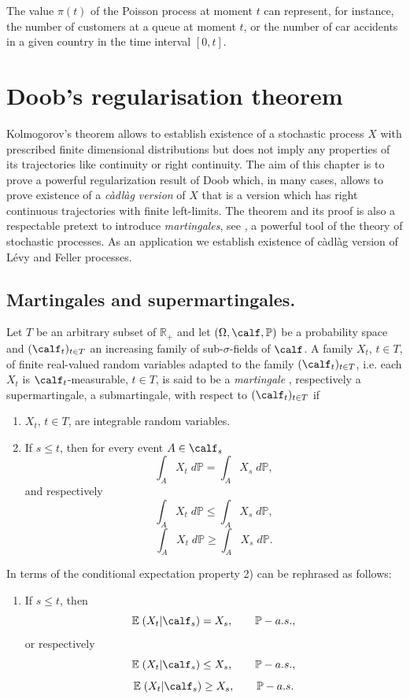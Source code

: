 \documentclass[preprint]{imsart}
\def\P{\mathbb P}
\def\E{\mathbb E}
\def\R{\mathbb R}
\begin{document}
{\noindent The value $\pi (t)$ of the Poisson process at moment $t$ can represent,
for instance, the number of customers at a queue at moment $t$, or the number of
car accidents in a given country in the  time interval $[0, t]$.






\chapter{Doob's regularisation theorem}

Kolmogorov's theorem allows to establish existence of a stochastic
process $X$ with prescribed finite dimensional distributions
but does not imply any properties of its
trajectories like continuity or right
continuity. The aim of this chapter is to prove a powerful
regularization result of Doob which, in many cases, allows to
prove existence of a {\it c\`adl\`ag version} of $X$ that is a version which  has right continuous
trajectories with finite left-limits. The theorem and its proof is
also a respectable pretext to introduce {\it martingales}, see \cite{bib6}, a powerful tool of the
theory of stochastic processes. As an application we establish existence of c\`adl\`ag version of L\'evy and
Feller processes.

\section{Martingales and supermartingales.}

Let $T$ be an arbitrary subset of $\R_+$  and let $(\Omega,
\calf,\P)$ be a probability space and $(\calf_t)_{t\in T}$ an
increasing family of sub-$\sigma$-fields of $\calf$. A family
$X_t$, $t\in T$, of finite real-valued random variables
adapted to the family $(\calf_t)_{t\in T}$,
i.e. each $X_t$ is $\calf_t$-measurable, $t\in T$, is said to be a
{\em martingale} \cite{bib14}, respectively a supermartingale, a
submartingale, with respect to  $(\calf_t)_{t\in T}$ if
\begin{enumerate}
\item[1)] $X_t$, $t\in T$, are integrable random variables.
\item[2)] If $s\leq t$, then for every event $A\in\calf_s$
$$
\int_A X_t\; d\P=\int_A X_s\; d\P,
$$
and respectively
$$
\int_A X_t\; d\P\le \int_A X_s\; d\P,
$$
$$
\int_A X_t\; d\P\ge \int_A X_s\; d\P.
$$
\end{enumerate}
In terms of the conditional expectation property 2) can be
rephrased as follows:
\begin{enumerate}
\item[2')] If $s\leq t$, then
$$
\E\; ( X_t|\calf_s) = X_s,\qquad \P-a.s.,
$$
or respectively
$$
\E\; ( X_t|\calf_s) \le  X_s,\qquad \P-a.s.,
$$
$$
\E\; ( X_t|\calf_s) \ge  X_s,\qquad \P-a.s.
$$
\end{enumerate}

}
\end{document}
